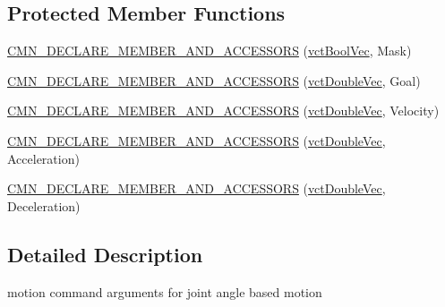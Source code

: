 \subsection*{Protected Member Functions}
\begin{DoxyCompactItemize}
\item 
\hyperlink{classprm_position_joint_set_ada5c1289e193a40555f3b44fb2ad76d9}{C\-M\-N\-\_\-\-D\-E\-C\-L\-A\-R\-E\-\_\-\-M\-E\-M\-B\-E\-R\-\_\-\-A\-N\-D\-\_\-\-A\-C\-C\-E\-S\-S\-O\-R\-S} (\hyperlink{vct_dynamic_vector_types_8h_aeb2237c134aee3769198bd9d55c8a9e0}{vct\-Bool\-Vec}, Mask)
\item 
\hyperlink{classprm_position_joint_set_aab14afd4e0a4265ba9d5cbb80536fc63}{C\-M\-N\-\_\-\-D\-E\-C\-L\-A\-R\-E\-\_\-\-M\-E\-M\-B\-E\-R\-\_\-\-A\-N\-D\-\_\-\-A\-C\-C\-E\-S\-S\-O\-R\-S} (\hyperlink{vct_dynamic_vector_types_8h_ade4b3068c86fb88f41af2e5187e491c2}{vct\-Double\-Vec}, Goal)
\item 
\hyperlink{classprm_position_joint_set_ae24e2aa020e3ef9537ccc17ff55fd5d4}{C\-M\-N\-\_\-\-D\-E\-C\-L\-A\-R\-E\-\_\-\-M\-E\-M\-B\-E\-R\-\_\-\-A\-N\-D\-\_\-\-A\-C\-C\-E\-S\-S\-O\-R\-S} (\hyperlink{vct_dynamic_vector_types_8h_ade4b3068c86fb88f41af2e5187e491c2}{vct\-Double\-Vec}, Velocity)
\item 
\hyperlink{classprm_position_joint_set_aceb5a01265725a71104cb269459b0c8d}{C\-M\-N\-\_\-\-D\-E\-C\-L\-A\-R\-E\-\_\-\-M\-E\-M\-B\-E\-R\-\_\-\-A\-N\-D\-\_\-\-A\-C\-C\-E\-S\-S\-O\-R\-S} (\hyperlink{vct_dynamic_vector_types_8h_ade4b3068c86fb88f41af2e5187e491c2}{vct\-Double\-Vec}, Acceleration)
\item 
\hyperlink{classprm_position_joint_set_a5cc46da95e7d7d8ca59b29bcdd194001}{C\-M\-N\-\_\-\-D\-E\-C\-L\-A\-R\-E\-\_\-\-M\-E\-M\-B\-E\-R\-\_\-\-A\-N\-D\-\_\-\-A\-C\-C\-E\-S\-S\-O\-R\-S} (\hyperlink{vct_dynamic_vector_types_8h_ade4b3068c86fb88f41af2e5187e491c2}{vct\-Double\-Vec}, Deceleration)
\end{DoxyCompactItemize}


\subsection{Detailed Description}
motion command arguments for joint angle based motion 

